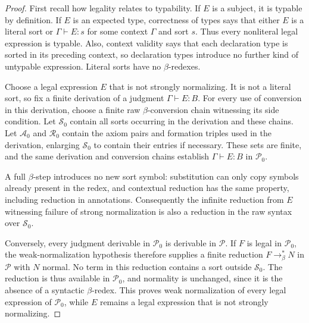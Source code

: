 \begin{proof}
First recall how legality relates to typability.  If $E$ is a subject,
it is typable by definition.  If $E$ is an expected type, correctness of
types says that either $E$ is a literal sort or $\Gamma\vdash E:s$ for
some context $\Gamma$ and sort $s$.  Thus every nonliteral legal
expression is typable.  Also, context validity says that each declaration
type is sorted in its preceding context, so declaration types introduce
no further kind of untypable expression.  Literal sorts have no
$\beta$-redexes.

Choose a legal expression $E$ that is not strongly normalizing.  It is
not a literal sort, so fix a finite derivation of a judgment
$\Gamma\vdash E:B$.  For every use of conversion in this derivation,
choose a finite raw $\beta$-conversion chain witnessing its side
condition.  Let $\mathcal S_0$ contain all sorts occurring in the
derivation and these chains.  Let $\mathcal A_0$ and $\mathcal R_0$
contain the axiom pairs and formation triples used in the derivation,
enlarging $\mathcal S_0$ to contain their entries if necessary.  These
sets are finite, and the same derivation and conversion chains establish
$\Gamma\vdash E:B$ in $\mathcal P_0$.

A full $\beta$-step introduces no new sort symbol: substitution can only
copy symbols already present in the redex, and contextual reduction has
the same property, including reduction in annotations.  Consequently
the infinite reduction from $E$ witnessing failure of strong
normalization is also a reduction in the raw syntax over
$\mathcal S_0$.

Conversely, every judgment derivable in $\mathcal P_0$ is derivable in
$\mathcal P$.  If $F$ is legal in $\mathcal P_0$, the weak-normalization
hypothesis therefore supplies a finite reduction $F\to_\beta^*N$ in
$\mathcal P$ with $N$ normal.  No term in this reduction contains a sort
outside $\mathcal S_0$.  The reduction is thus available in
$\mathcal P_0$, and normality is unchanged, since it is the absence of a
syntactic $\beta$-redex.  This proves weak normalization of every legal
expression of $\mathcal P_0$, while $E$ remains a legal expression that
is not strongly normalizing.
\end{proof}

